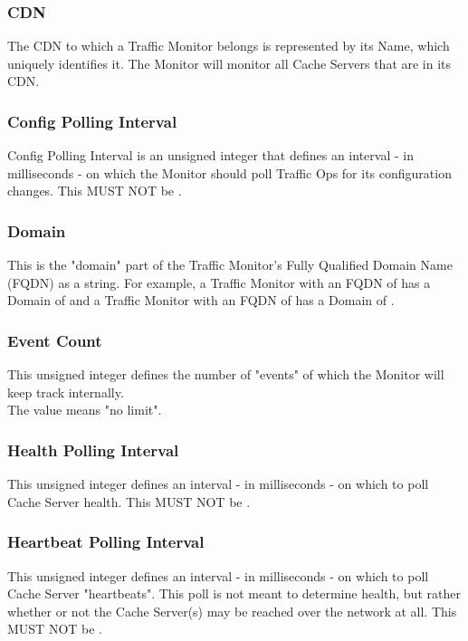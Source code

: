 \subsubsection{CDN}
The CDN to which a Traffic Monitor belongs is represented by its Name, which
uniquely identifies it. The Monitor will monitor all Cache Servers that are in
its CDN.

\subsubsection{Config Polling Interval}
Config Polling Interval is an unsigned integer that defines an interval - in
milliseconds - on which the Monitor should poll Traffic Ops for its
configuration changes. This MUST NOT be .

\subsubsection{Domain}
This is the "domain" part of the Traffic Monitor's Fully Qualified Domain Name
(FQDN) as a string. For example, a Traffic Monitor with an FQDN of
 has a Domain of  and a Traffic Monitor with an FQDN
of  has a Domain of .

\subsubsection{Event Count}
This unsigned integer defines the number of "events" of which the Monitor will
keep track internally.\\
The value  means "no limit".

\subsubsection{Health Polling Interval}
This unsigned integer defines an interval - in milliseconds - on which to poll
Cache Server health. This MUST NOT be .

\subsubsection{Heartbeat Polling Interval}
This unsigned integer defines an interval - in milliseconds - on which to poll
Cache Server "heartbeats". This poll is not meant to determine health, but
rather whether or not the Cache Server(s) may be reached over the network at
all. This MUST NOT be .

